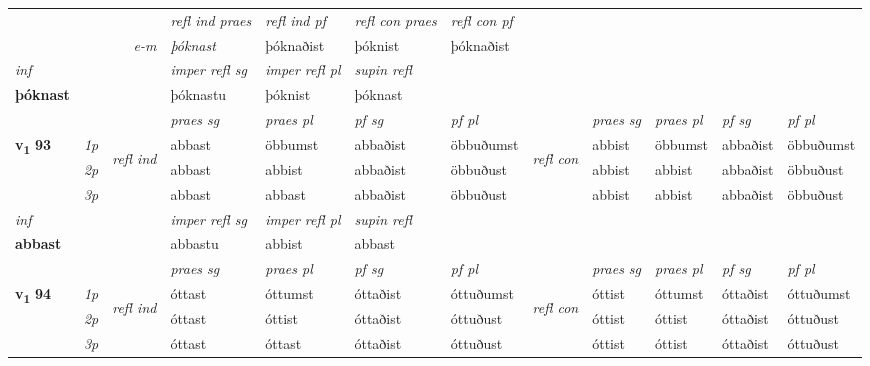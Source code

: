 \begin{longtable}[l]{X>{\footnotesize\itshape}llXXXXlXXXX}
 & && \textit{refl ind praes} & \textit{refl ind pf} & \textit{refl con praes} & \textit{refl con pf} \\*
\multicolumn{3}{r}{\textit{e-m}}& þóknast & þóknaðist & þóknist & þóknaðist \\*

\cmidrule{4-7}
   {\textit{inf}} & &   & \textit{imper refl sg} & \textit{imper refl pl}   & \textit{supin refl}  \\*
  {\textbf{þóknast}} & &   & þóknastu & þóknist   & þóknast  \\*

\midrule

 & &   & \textit{praes sg}  & \textit{praes pl}    & \textit{ pf sg} & \textit{pf pl} & & \textit{praes sg}  & \textit{praes pl}    & \textit{pf sg} & \textit{pf pl }  \\ \cmidrule{4-7} \cmidrule{9-12}
 \multirow{2}{*}{{{\textbf{v{\textsubscript{1}}} \Large{\textbf{93}}}}}  & 1p & \multirow{3}{*}{\begin{turn}{90}\textit{refl ind}\end{turn}}  & abbast & öbbumst & abbaðist & öbbuðumst & \multirow{3}{*}{\begin{turn}{90}\textit{refl con}\end{turn}}  &abbist & öbbumst & abbaðist & öbbuðumst \\*
 & 2p &  & abbast & abbist & abbaðist & öbbuðust & &abbist & abbist & abbaðist & öbbuðust \\*
 & 3p  & & abbast & abbast & abbaðist & öbbuðust & & abbist & abbist& abbaðist & öbbuðust \\*
\cmidrule{4-7} \cmidrule{9-12}

   {\textit{inf}} & &   & \textit{imper refl sg} & \textit{imper refl pl}   & \textit{supin refl}  \\*
  {\textbf{abbast}} & &   & abbastu & abbist   & abbast  \\*

\midrule

 & &   & \textit{praes sg}  & \textit{praes pl}    & \textit{ pf sg} & \textit{pf pl} & & \textit{praes sg}  & \textit{praes pl}    & \textit{pf sg} & \textit{pf pl }  \\ \cmidrule{4-7} \cmidrule{9-12}
 \multirow{2}{*}{{{\textbf{v{\textsubscript{1}}} \Large{\textbf{94}}}}}  & 1p & \multirow{3}{*}{\begin{turn}{90}\textit{refl ind}\end{turn}}  & óttast & óttumst & óttaðist & óttuðumst & \multirow{3}{*}{\begin{turn}{90}\textit{refl con}\end{turn}}  &óttist & óttumst & óttaðist & óttuðumst \\*
 & 2p &  & óttast & óttist & óttaðist & óttuðust & &óttist & óttist & óttaðist & óttuðust \\*
 & 3p  & & óttast & óttast & óttaðist & óttuðust & & óttist & óttist& óttaðist & óttuðust \\*
\cmidrule{4-7} \cmidrule{9-12}


\end{longtable}
